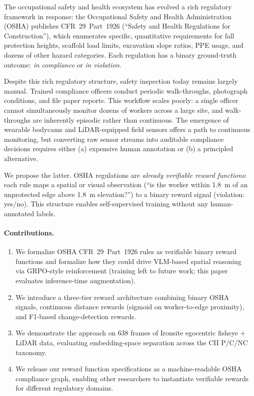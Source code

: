 \documentclass[sigconf,nonacm]{acmart}
\begin{document}
The occupational safety and health ecosystem has evolved a rich regulatory
framework in response: the Occupational Safety and Health Administration
(OSHA) publishes CFR~29~Part~1926 (``Safety and Health Regulations for
Construction''), which enumerates specific, quantitative requirements for
fall protection heights, scaffold load limits, excavation slope ratios,
PPE usage, and dozens of other hazard categories.
Each regulation has a binary ground-truth outcome: \emph{in compliance}
or \emph{in violation}.

Despite this rich regulatory structure, safety inspection today remains
largely manual.
Trained compliance officers conduct periodic walk-throughs, photograph
conditions, and file paper reports.
This workflow scales poorly: a single officer cannot simultaneously monitor
dozens of workers across a large site, and walk-throughs are inherently
episodic rather than continuous.
The emergence of wearable bodycams and LiDAR-equipped field sensors offers
a path to continuous monitoring, but converting raw sensor streams into
auditable compliance decisions requires either (a) expensive human
annotation or (b) a principled alternative.

We propose the latter.
OSHA regulations are \emph{already verifiable reward functions}:
each rule maps a spatial or visual observation (``is the worker within
1.8~m of an unprotected edge above 1.8~m elevation?'') to a binary
reward signal (violation: yes/no).
This structure enables self-supervised training without any human-annotated
labels.

\paragraph{Contributions.}
\begin{enumerate}
  \item We formalize OSHA CFR~29~Part~1926 rules as verifiable binary
        reward functions and formalize how they could drive VLM-based
        spatial reasoning via GRPO-style reinforcement (training left to
        future work; this paper evaluates inference-time augmentation).
  \item We introduce a three-tier reward architecture combining binary
        OSHA signals, continuous distance rewards (sigmoid on
        worker-to-edge proximity), and F1-based change-detection rewards.
  \item We demonstrate the approach on 638 frames of Ironsite
        egocentric fisheye + LiDAR data, evaluating embedding-space
        separation across the CII P/C/NC taxonomy.
  \item We release our reward function specifications as a machine-readable
        OSHA compliance graph, enabling other researchers to instantiate
        verifiable rewards for different regulatory domains.
\end{enumerate}
\end{document}
